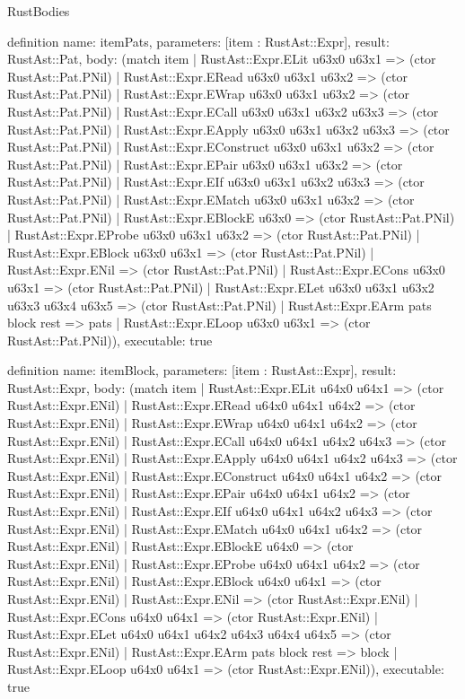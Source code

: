 \begin{lexlean}{RustBodies}
\begin{semanticmodule}
definition{
  name: itemPats,
  parameters: [item : RustAst::Expr],
  result: RustAst::Pat,
  body: (match item
    | RustAst::Expr.ELit u63x0 u63x1 => (ctor RustAst::Pat.PNil)
    | RustAst::Expr.ERead u63x0 u63x1 u63x2 => (ctor RustAst::Pat.PNil)
    | RustAst::Expr.EWrap u63x0 u63x1 u63x2 => (ctor RustAst::Pat.PNil)
    | RustAst::Expr.ECall u63x0 u63x1 u63x2 u63x3 => (ctor RustAst::Pat.PNil)
    | RustAst::Expr.EApply u63x0 u63x1 u63x2 u63x3 => (ctor RustAst::Pat.PNil)
    | RustAst::Expr.EConstruct u63x0 u63x1 u63x2 => (ctor RustAst::Pat.PNil)
    | RustAst::Expr.EPair u63x0 u63x1 u63x2 => (ctor RustAst::Pat.PNil)
    | RustAst::Expr.EIf u63x0 u63x1 u63x2 u63x3 => (ctor RustAst::Pat.PNil)
    | RustAst::Expr.EMatch u63x0 u63x1 u63x2 => (ctor RustAst::Pat.PNil)
    | RustAst::Expr.EBlockE u63x0 => (ctor RustAst::Pat.PNil)
    | RustAst::Expr.EProbe u63x0 u63x1 u63x2 => (ctor RustAst::Pat.PNil)
    | RustAst::Expr.EBlock u63x0 u63x1 => (ctor RustAst::Pat.PNil)
    | RustAst::Expr.ENil => (ctor RustAst::Pat.PNil)
    | RustAst::Expr.ECons u63x0 u63x1 => (ctor RustAst::Pat.PNil)
    | RustAst::Expr.ELet u63x0 u63x1 u63x2 u63x3 u63x4 u63x5 => (ctor RustAst::Pat.PNil)
    | RustAst::Expr.EArm pats block rest => pats
    | RustAst::Expr.ELoop u63x0 u63x1 => (ctor RustAst::Pat.PNil)),
  executable: true
}

definition{
  name: itemBlock,
  parameters: [item : RustAst::Expr],
  result: RustAst::Expr,
  body: (match item
    | RustAst::Expr.ELit u64x0 u64x1 => (ctor RustAst::Expr.ENil)
    | RustAst::Expr.ERead u64x0 u64x1 u64x2 => (ctor RustAst::Expr.ENil)
    | RustAst::Expr.EWrap u64x0 u64x1 u64x2 => (ctor RustAst::Expr.ENil)
    | RustAst::Expr.ECall u64x0 u64x1 u64x2 u64x3 => (ctor RustAst::Expr.ENil)
    | RustAst::Expr.EApply u64x0 u64x1 u64x2 u64x3 => (ctor RustAst::Expr.ENil)
    | RustAst::Expr.EConstruct u64x0 u64x1 u64x2 => (ctor RustAst::Expr.ENil)
    | RustAst::Expr.EPair u64x0 u64x1 u64x2 => (ctor RustAst::Expr.ENil)
    | RustAst::Expr.EIf u64x0 u64x1 u64x2 u64x3 => (ctor RustAst::Expr.ENil)
    | RustAst::Expr.EMatch u64x0 u64x1 u64x2 => (ctor RustAst::Expr.ENil)
    | RustAst::Expr.EBlockE u64x0 => (ctor RustAst::Expr.ENil)
    | RustAst::Expr.EProbe u64x0 u64x1 u64x2 => (ctor RustAst::Expr.ENil)
    | RustAst::Expr.EBlock u64x0 u64x1 => (ctor RustAst::Expr.ENil)
    | RustAst::Expr.ENil => (ctor RustAst::Expr.ENil)
    | RustAst::Expr.ECons u64x0 u64x1 => (ctor RustAst::Expr.ENil)
    | RustAst::Expr.ELet u64x0 u64x1 u64x2 u64x3 u64x4 u64x5 => (ctor RustAst::Expr.ENil)
    | RustAst::Expr.EArm pats block rest => block
    | RustAst::Expr.ELoop u64x0 u64x1 => (ctor RustAst::Expr.ENil)),
  executable: true
}


\end{semanticmodule}
\end{lexlean}
